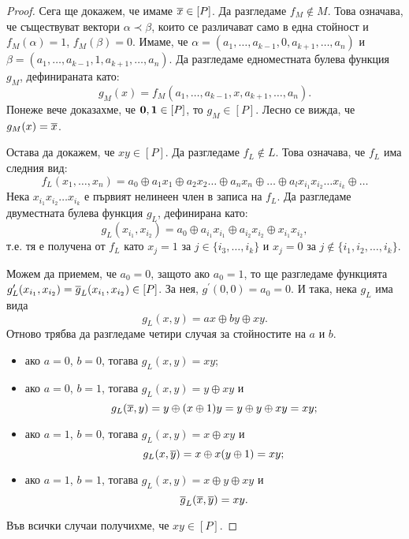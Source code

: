 \begin{proof}
  Сега ще докажем, че имаме $\overline{x} \in [P]$.
  Да разгледаме $f_M \not\in M$. Това означава, че съществуват вектори $\alpha  \prec \beta$, които се различават
  само в една стойност и $f_M(\alpha) = 1$, $f_M(\beta) = 0$.
  Имаме, че  $\alpha = (a_1,\dots,a_{k-1},0,a_{k+1},\dots,a_n)$ и $\beta = (a_1,\dots,a_{k-1},1,a_{k+1},\dots,a_n)$.
  Да разгледаме едноместната булева функция $g_M$, дефинираната като:
  \[g_M(x) = f_M(a_1,\dots,a_{k-1},x,a_{k+1},\dots,a_n).\]
  Понеже вече доказахме, че ${\bf 0},{\bf 1} \in [P]$, то $g_M \in [P]$.
  Лесно се вижда, че $g_M(x) = \overline{x}$. 

  Остава да докажем, че $xy \in [P]$.
  Да разгледаме $f_L \not\in L$. Това означава, че $f_L$ има следния вид:
  \[f_L(x_1,\dots,x_n) = a_0 \oplus a_1x_1\oplus a_2x_2 \dots\oplus a_n x_n\oplus \dots \oplus a_lx_{i_1}x_{i_2}\dots x_{i_k}\oplus\dots \]
  Нека $x_{i_1}x_{i_2}\dots x_{i_k}$ е първият нелинеен член в записа на $f_L$.
  Да разгледаме двуместната булева функция $g_L$, дефинирана като:
  \[g_L(x_{i_1},x_{i_2}) = a_0 \oplus a_{i_1}x_{i_1} \oplus a_{i_2}x_{i_2} \oplus x_{i_1}x_{i_2},\]
  т.е. тя е получена от $f_L$ като $x_{j} = 1$ за $j \in \{i_3,\dots,i_k\}$ и $x_j = 0$ за $j \not\in\{i_1,i_2,\dots,i_k\}$.
  
  Можем да приемем, че $a_0 = 0$, защото ако $a_0 = 1$, то ще разгледаме функцията $g^\prime_L(x_{i_1},x_{i_2}) = \overline{g}_L(x_{i_1},x_{i_2}) \in [P]$.
  За нея, $g^\prime(0,0) = a_0 = 0$.
  И така, нека $g_L$ има вида
  \[g_L(x,y) = ax\oplus by \oplus xy.\]
  Отново трябва да разгледаме четири случая за стойностите на $a$ и $b$.
  \begin{itemize}
  \item 
    ако $a = 0$, $b = 0$, тогава $g_L(x,y) = xy$;
  \item 
    ако $a = 0$, $b = 1$, тогава $g_L(x,y) = y \oplus xy$ и 
    \[g_L(\overline{x},y) = y\oplus (x\oplus 1)y = y \oplus y \oplus xy = xy;\]
  \item 
    ако $a = 1$, $b = 0$, тогава $g_L(x,y) = x\oplus xy$ и
    \[g_L(x, \overline{y}) = x\oplus x(y\oplus 1) = xy;\]
  \item 
    ако $a = 1$, $b = 1$, тогава $g_L(x,y) = x \oplus y \oplus xy$ и
    \[\overline{g}_L(\overline{x},\overline{y}) = xy.\]
  \end{itemize}
  Във всички случаи получихме, че $xy \in [P]$.
\end{proof}

